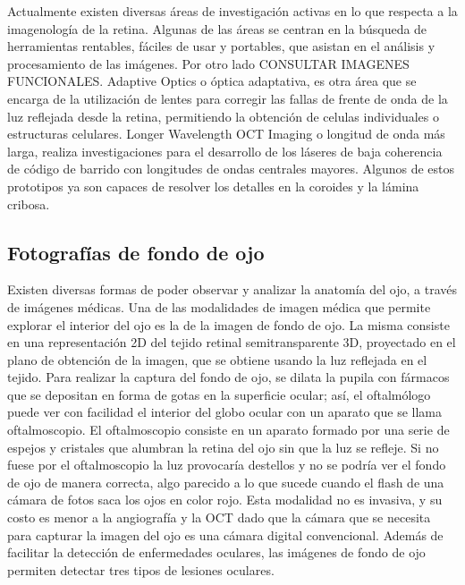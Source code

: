 Actualmente existen diversas \'areas de investigación activas en lo que respecta a la imagenología de la retina. Algunas de las \'areas se centran en la b\'usqueda de herramientas rentables, f\'aciles de usar y portables, que asistan en el análisis y procesamiento de las imágenes. Por otro lado CONSULTAR IMAGENES FUNCIONALES. Adaptive Optics o \'optica adaptativa, es otra \'area que se encarga de la utilizaci\'on de lentes para corregir las fallas de frente de onda de la luz reflejada desde la retina, permitiendo la obtenci\'on de celulas individuales o estructuras celulares.
Longer Wavelength OCT Imaging o longitud de onda m\'as larga, realiza investigaciones para el desarrollo de los l\'aseres de baja coherencia de c\'odigo de barrido con longitudes de ondas centrales mayores. Algunos de estos prototipos ya son capaces de resolver los detalles en la coroides y la l\'amina cribosa.


\subsection{Fotograf\'ias de fondo de ojo}

Existen diversas formas de poder observar y analizar la anatom\'ia del ojo, a trav\'es de im\'agenes m\'edicas. 
Una de las modalidades de imagen m\'edica que permite explorar el interior del ojo es la de la imagen de fondo de ojo. La misma consiste en  una representaci\'on 2D del tejido retinal semitransparente 3D, proyectado en el plano de obtenci\'on de la imagen, que se obtiene usando la luz reflejada en el tejido.
Para realizar la captura del fondo de ojo, se dilata la pupila con f\'armacos que se depositan en forma de gotas en la superficie ocular; as\'i, el oftalm\'ologo puede ver con facilidad el interior del globo ocular con un aparato que se llama oftalmoscopio. El oftalmoscopio consiste en un aparato formado por una serie de espejos y cristales que alumbran la retina del ojo sin que la luz se refleje. Si no fuese por el oftalmoscopio la luz provocar\'ia destellos y no se podría ver el fondo de ojo de manera correcta, algo parecido a lo que sucede cuando el flash de una cámara de fotos saca los ojos en color rojo. Esta modalidad no es invasiva, y su costo es menor a la angiografía y la OCT dado que la c\'amara que se necesita para capturar la imagen del ojo es una c\'amara digital convencional.
Adem\'as de facilitar la detecci\'on de enfermedades oculares, las im\'agenes de fondo de ojo permiten detectar tres tipos de lesiones oculares. 

